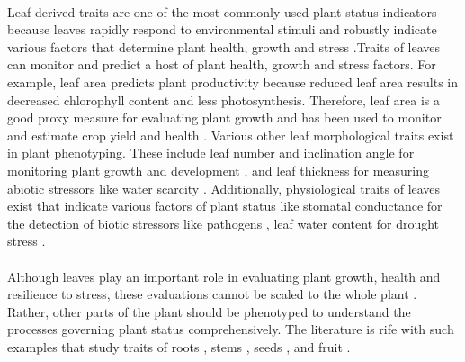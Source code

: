 \paragraph{}
Leaf-derived traits are one of the most commonly used plant status indicators because leaves rapidly respond to environmental stimuli and robustly indicate various factors that determine plant health, growth and stress \cite{zhangHighthroughputPhenotypingPlant2023}.Traits of leaves can monitor and predict a host of plant health, growth and stress factors. For example, leaf area predicts plant productivity because reduced leaf area results in decreased chlorophyll content and less photosynthesis. Therefore, leaf area is a good proxy measure for evaluating plant growth and has been used to monitor and estimate crop yield and health \cite{zhangLeafAreaIndex2021}. Various other leaf morphological traits exist in plant phenotyping. These include leaf number and inclination angle for monitoring plant growth and development \cite{praveenkumarRosettePlantSegmentation2020, zhangHighthroughputPhenotypingPlant2023}, and leaf thickness for measuring abiotic stressors like water scarcity \cite{afzalLeafThicknessPredict2017}. Additionally, physiological traits of leaves exist that indicate various factors of plant status like stomatal conductance for the detection of biotic stressors like pathogens \cite{ishimweApplicationsThermalImaging2014}, leaf water content for drought stress \cite{watanabeFundamentalStudyWater2022}. 

\paragraph{}
Although leaves play an important role in evaluating plant growth, health and resilience to stress, these evaluations cannot be scaled to the whole plant \cite{zhangHighthroughputPhenotypingPlant2023}. Rather, other parts of the plant should be phenotyped to understand the processes governing plant status comprehensively. The literature is rife with such examples that study traits of roots \cite{bodnerHyperspectralImagingNovel2018}, stems \cite{daschoudhuryAutomatedStemAngle2017}, seeds \cite{zhangHighThroughputPhenotypingSeed2018}, and fruit \cite{abebeImageBasedHighThroughputPhenotyping2023}.